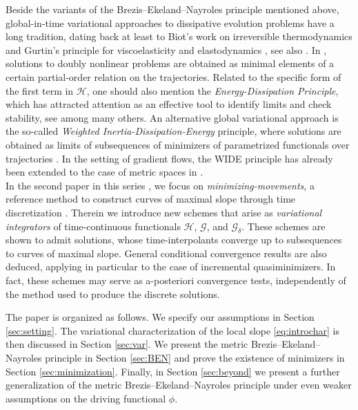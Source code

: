 \documentclass[reqno]{amsart}
\newcommand{\GG}{{\mathcal G}}
\newcommand{\HH}{{\mathcal H}}
\begin{document}
Beside  the variants of the Brezis--Ekeland--Nayroles
principle mentioned above, global-in-time variational
approaches to dissipative evolution problems have  a long
tradition, dating back at least to Biot's work on irreversible
thermodynamics \cite{Biot55} and Gurtin's principle for
viscoelasticity and elastodynamics
\cite{Gurtin63,Gurtin64b}, see also \cite{Hlavacek69}. In \cite{Visintin01}, solutions to
doubly nonlinear problems are obtained as minimal elements of a
certain partial-order relation on the trajectories. Related to the
specific form  of  the first term in $\HH$, one should also mention the
{\it Energy-Dissipation Principle}, which has attracted
attention  as  an effective tool to identify limits and check
stability, see
\cite{Dondl19,Frenzel,Mielke20,Mielke21,Sandier04,Serfaty11} among
many others.
An alternative global variational approach is the so-called {\it
  Weighted Inertia-Dissipation-Energy} principle, where
solutions are obtained as limits of subsequences of minimizers of
parametrized functionals over trajectories
\cite{Stefanelli25}.
In the setting of gradient flows, the WIDE principle has already been extended to the case of metric spaces in \cite{Rossi11,Rossi19}.\\

 In the second
paper  in  this series  
  \cite{cuore3}, we focus on {\it minimizing-movements}, a reference method to construct curves of maximal slope through 
time discretization \cite{Ambrosio95}. Therein we introduce new schemes  that arise as    {\it variational integrators}
 of time-continuous functionals $\HH$, $\GG$, and $\GG_\delta$. 
  These schemes
 are  shown  to  admit  solutions, whose
time-interpolants converge up to subsequences  to
curves of maximal slope. General conditional convergence results are
also deduced, applying in particular to the case of incremental
quasiminimizers.  In fact, these schemes may serve as a-posteriori convergence  tests, independently  of 
the method used to produce the discrete solutions.  

 The paper is organized as follows. We specify our
  assumptions in Section \ref{sec:setting}. The variational
  characterization of the local slope \eqref{eq:introchar} is then
  discussed in Section \ref{sec:var}. We present the metric
  Brezis--Ekeland--Nayroles principle in Section
  \ref{sec:BEN} and prove the existence of minimizers in Section
  \ref{sec:minimization}.  Finally,    in Section
  \ref{sec:beyond}  we present a further
  generalization of the metric Brezis--Ekeland--Nayroles principle
  under even weaker assumptions on the driving functional $\phi$.
\end{document}
